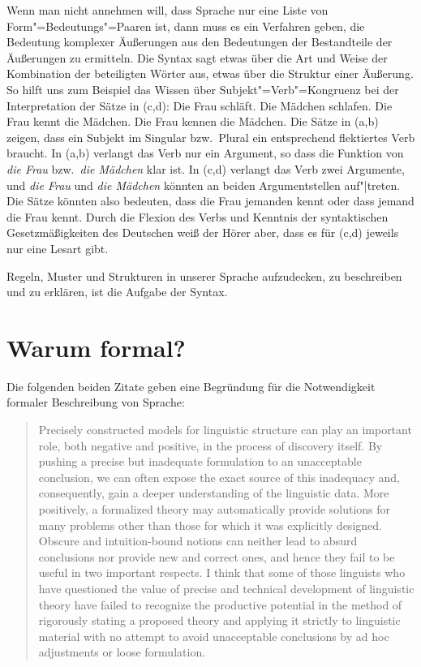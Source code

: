 \documentclass[ number=45
			   ,series=eotms
			   ,printondemand
			  ]{langsci}
\newcommand{\page}{S.\,}
\begin{document}
Wenn man nicht annehmen will, dass Sprache nur eine Liste von Form"=Bedeutungs"=Paaren
ist, dann muss es ein Verfahren geben, die Bedeutung komplexer Äußerungen aus
den Bedeutungen der Bestandteile der Äußerungen zu ermitteln.
Die Syntax sagt etwas über die Art und Weise der Kombination der beteiligten
Wörter aus, etwas über die Struktur einer Äußerung.
So hilft uns zum Beispiel das Wissen über Subjekt"=Verb"=Kongruenz bei der Interpretation
der Sätze in (c,d):
\eal
\label{Beispiel-mit-Kongruenz}
\ex Die Frau schläft.
\ex Die Mädchen schlafen.
\ex Die Frau kennt  die Mädchen.
\ex Die Frau kennen die Mädchen.
\zl
Die Sätze in (a,b) zeigen, dass ein Subjekt im Singular bzw.\ Plural
ein entsprechend flektiertes Verb braucht. In (a,b) verlangt das Verb nur ein
Argument, so dass die Funktion von \emph{die Frau} bzw.\ \emph{die Mädchen} klar ist.
In (c,d) verlangt das Verb zwei Argumente, und \emph{die Frau} und \emph{die Mädchen}
könnten an beiden Argumentstellen auf"|treten. Die Sätze könnten also bedeuten, dass
die Frau jemanden kennt oder dass jemand die Frau kennt. Durch die Flexion des Verbs und
Kenntnis der syntaktischen Gesetzmäßigkeiten des Deutschen weiß der Hörer
aber, dass es für (c,d) jeweils nur eine Lesart gibt.

Regeln, Muster und Strukturen in unserer Sprache aufzudecken, zu beschreiben und zu erklären, ist
die Aufgabe der Syntax. 


\section{Warum formal?}
\label{sec-formal}

Die folgenden beiden Zitate geben eine Begründung für die Notwendigkeit
formaler Beschreibung von Sprache:  
\begin{quote}
\label{quote-Chomsky-Formalisierung}%
Precisely constructed models for linguistic structure can play an
important role, both negative and positive, in the process of discovery 
itself. By pushing a precise but inadequate formulation to
an unacceptable conclusion, we can often expose the exact source
of this inadequacy and, consequently, gain a deeper understanding
of the linguistic data. More positively, a formalized theory may 
automatically provide solutions for many problems other than those
for which it was explicitly designed. Obscure and intuition-bound
notions can neither lead to absurd conclusions nor provide new and
correct ones, and hence they fail to be useful in two important respects. 
I think that some of those linguists who have questioned
the value of precise and technical development of linguistic theory
have failed to recognize the productive potential in the method
of rigorously stating a proposed theory and applying it strictly to
linguistic material with no attempt to avoid unacceptable conclusions 
by ad hoc adjustments or loose formulation.
\citep[\page5]{Chomsky57a}
\end{quote}
\end{document}
